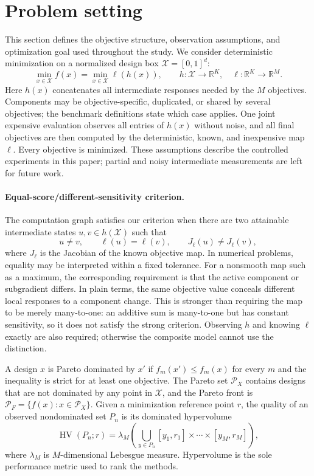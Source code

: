 \documentclass{article}
\newcommand{\R}{\mathbb{R}}
\newcommand{\HV}{\operatorname{HV}}
\newcommand{\composemap}{\ell}
\begin{document}
\section{Problem setting}
\label{sec:problem}

This section defines the objective structure, observation assumptions, and
optimization goal used throughout the study.  We consider deterministic
minimization on a normalized design box
$\mathcal X=[0,1]^d$:
\begin{equation}
  \min_{x\in\mathcal X} f(x)
  =\min_{x\in\mathcal X}\composemap(h(x)),
  \qquad h:\mathcal X\rightarrow\R^K,
  \quad \composemap:\R^K\rightarrow\R^M.
  \label{eq:problem}
\end{equation}
Here $h(x)$ concatenates all intermediate responses needed by the $M$
objectives.  Components may be objective-specific, duplicated, or shared by
several objectives; the benchmark definitions state which case applies.  One
joint expensive evaluation observes all entries of $h(x)$ without noise, and
all final objectives are then computed by the deterministic, known, and
inexpensive map $\composemap$.  Every objective is minimized.  These assumptions
describe the controlled experiments in this paper; partial and noisy
intermediate measurements are left for future work.

\paragraph{Equal-score/different-sensitivity criterion.}
The computation graph satisfies our criterion when there are two attainable
intermediate states $u,v\in h(\mathcal X)$ such that
\[
u\ne v,\qquad \composemap(u)=\composemap(v),\qquad
J_{\composemap}(u)\ne J_{\composemap}(v),
\]
where $J_{\composemap}$ is the Jacobian of the known objective map.  In
numerical problems, equality may be interpreted within a fixed tolerance.  For
a nonsmooth map such as a maximum, the corresponding requirement is that the
active component or subgradient differs.  In plain terms, the same objective
value conceals different local responses to a component change.  This is
stronger than requiring the map to be merely many-to-one: an additive sum is
many-to-one but has constant sensitivity, so it does not satisfy the strong
criterion.  Observing $h$ and knowing $\composemap$ exactly are also required;
otherwise the composite model cannot use the distinction.

A design $x$ is Pareto dominated by $x'$ if
$f_m(x')\le f_m(x)$ for every $m$ and the inequality is strict for at least one
objective.  The Pareto set $\mathcal P_X$ contains designs that are not
dominated by any point in $\mathcal X$, and the Pareto front is
$\mathcal P_F=\{f(x):x\in\mathcal P_X\}$.  Given a minimization reference point
$r$, the quality of an observed nondominated set $P_n$ is its dominated
hypervolume
\begin{equation}
  \HV(P_n;r)=\lambda_M\!\left(
  \bigcup_{y\in P_n}[y_1,r_1]\times\cdots\times[y_M,r_M]
  \right),
  \label{eq:hv}
\end{equation}
where $\lambda_M$ is $M$-dimensional Lebesgue measure.  Hypervolume is the sole
performance metric used to rank the methods.
\end{document}
